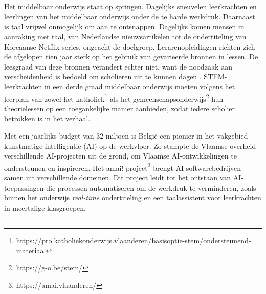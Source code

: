 
\chapter{}%
\label{ch:inleiding}


Het middelbaar onderwijs staat op springen. Dagelijks sneuvelen leerkrachten en leerlingen van het middelbaar onderwijs onder de te harde werkdruk. Daarnaast is taal vrijwel onmogelijk om aan te ontsnappen. Dagelijks komen mensen in aanraking met taal, van Nederlandse nieuwsartikelen tot de ondertiteling van Koreaanse Netflix-series, ongeacht de doelgroep. Lerarenopleidingen richten zich de afgelopen tien jaar sterk op het gebruik van gevarieerde bronnen in lessen. De leesgraad van deze bronnen verandert echter niet, want de noodzaak aan verscheidenheid is bedoeld om scholieren uit te kunnen dagen \autocite{Surma2019}. STEM-leerkrachten in een derde graad middelbaar onderwijs moeten volgens het leerplan van zowel het katholiek\footnote{https://pro.katholiekonderwijs.vlaanderen/basisoptie-stem/ondersteunend-materiaal} als het gemeenschapsonderwijs\footnote{https://g-o.be/stem/} hun theorielessen op een toegankelijke manier aanbieden, zodat iedere scholier betrokken is in het verhaal.

Met een jaarlijks budget van 32 miljoen is België een pionier \autocite{Crevits2022} in het vakgebied kunstmatige intelligentie (AI) op de werkvloer.  Zo stampte de Vlaamse overheid verschillende AI-projecten uit de grond, om Vlaamse AI-ontwikkelingen te ondersteunen en inspireren. Het amai!-project\footnote{https://amai.vlaanderen/}  brengt AI-softwarebedrijven samen uit verschillende domeinen. Dit project leidt tot het ontstaan van AI-toepassingen die processen automatiseren om de werkdruk te verminderen, zoals binnen het onderwijs \textit{real-time} ondertiteling en een taalassistent voor leerkrachten in meertalige klasgroepen.

\section{}%
\label{sec:probleemstelling}


